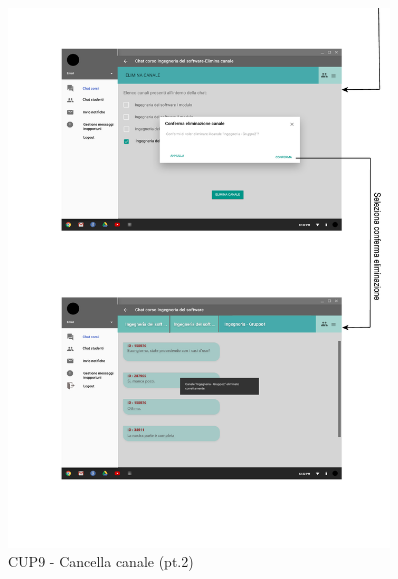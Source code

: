 \begin{figure}
	\centering
	\includegraphics[width=0.9\textwidth]{imgs/gruppo6/activities/act_cup9_cancella_canale2.pdf}
	\caption{CUP9 - Cancella canale (pt.2)}
	\label{fig:cup9-2}
\end{figure}

